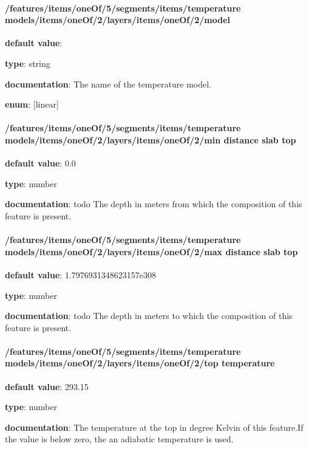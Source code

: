 \paragraph{/features/items/oneOf/5/segments/items/temperature models/items/oneOf/2/layers/items/oneOf/2/model} \begin{itemized}
\item {\bf default value}: 
\item {\bf type}: string
\item {\bf documentation}: The name of the temperature model.
\item {\bf enum}: [linear]\end{itemized}\paragraph{/features/items/oneOf/5/segments/items/temperature models/items/oneOf/2/layers/items/oneOf/2/min distance slab top} \begin{itemized}
\item {\bf default value}: 0.0
\item {\bf type}: number
\item {\bf documentation}: todo The depth in meters from which the composition of this feature is present.
\end{itemized}\paragraph{/features/items/oneOf/5/segments/items/temperature models/items/oneOf/2/layers/items/oneOf/2/max distance slab top} \begin{itemized}
\item {\bf default value}: 1.7976931348623157e308
\item {\bf type}: number
\item {\bf documentation}: todo The depth in meters to which the composition of this feature is present.
\end{itemized}\paragraph{/features/items/oneOf/5/segments/items/temperature models/items/oneOf/2/layers/items/oneOf/2/top temperature} \begin{itemized}
\item {\bf default value}: 293.15
\item {\bf type}: number
\item {\bf documentation}: The temperature at the top in degree Kelvin of this feature.If the value is below zero, the an adiabatic temperature is used.

\end{itemized}
